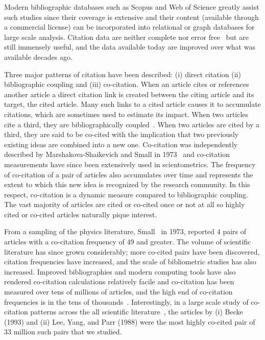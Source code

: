 \documentclass[11pt, oneside]{article}   	%
\begin{document}
Modern bibliographic databases such as Scopus and Web of Science greatly assist such studies since their coverage is extensive and their content (available through a commercial license) can be incorporated into relational or graph databases for large scale analysis. Citation data are neither complete nor error free~\citep{macroberts2017} but are still immensely useful, and the data available today are improved over what was available decades ago. 

Three major patterns of citation have been described: (i) direct citation (ii) bibliographic coupling and (iii) co-citation. When an article cites or references another article a direct citation link is created between the citing article and its target, the cited article. Many such links to a cited article causes it to accumulate citations, which are sometimes used to estimate its impact. When two articles cite a third, they are bibliographically coupled~\citep{Kessler1963}. When two articles are cited by a third, they are said to be co-cited with the implication that two previously existing ideas are combined into a new one. Co-citation was independently described by Marshakova-Shaikevich and Small in 1973~\citep{MarshakovaShaikevich1973,Small1973} and co-citation measurements have since been extensively used in scientometrics. The frequency of co-citation of a pair of articles  also accumulates over time and represents the extent to which this new idea is recognized by the research community. In this respect, co-citation is a dynamic measure compared to bibliographic coupling. The vast majority of articles are cited or co-cited once or not at all so highly cited or co-cited articles naturally pique interest. 

From a sampling of the physics literature, Small~\citep{Small1973} in 1973, reported 4 pairs of articles with a co-citation frequency of 49 and greater. The volume of scientific literature has since grown considerably; more co-cited pairs have been discovered, citation frequencies have increased, and the scale of bibliometric studies has also increased. Improved bibliographies and modern computing tools have also rendered co-citation calculations relatively facile and co-citation has been measured over tens of millions of articles, and the high end of co-citation frequencies is in the tens of thousands~\citep{Stringer2010,Uzzi2013,devarakonda_2020}. Interestingly, in a large scale study of co-citation patterns across the all scientific literature~\citep{devarakonda_2020}, the articles by (i) Becke (1993)\citep{becke1993dft} and (ii) Lee, Yang, and Parr (1988)\citep{lyp1988} were the most highly co-cited pair of 33 million such pairs that we studied. 
\end{document}
